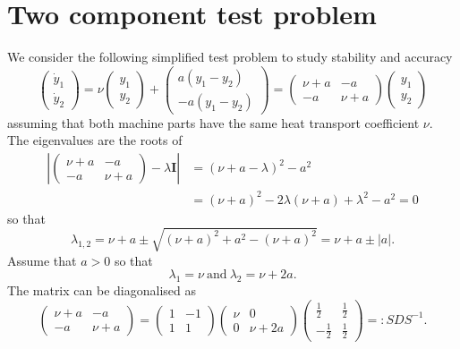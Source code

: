 \documentclass{article}
\newcommand{\ve}[1]{\mathbf{#1}}
\begin{document}
\section*{Two component test problem}
We consider the following simplified test problem to study stability and accuracy
\begin{equation}
	\begin{pmatrix} \dot{y}_1 \\ \dot{y}_2 \end{pmatrix} = \nu \begin{pmatrix} y_1 \\ y_2 \end{pmatrix} + \begin{pmatrix} a \left( y_1 - y_2 \right) \\ -a (y_1 - y_2) \end{pmatrix}
		= \begin{pmatrix}  \nu + a & -a \\ -a & \nu  +a \end{pmatrix} \begin{pmatrix} y_1 \\ y_2 \end{pmatrix}
\end{equation}
assuming that both machine parts have the same heat transport coefficient $\nu$.
The eigenvalues are the roots of
\begin{align*}
	\left| \begin{pmatrix}  \nu + a & -a \\ -a & \nu  +a \end{pmatrix} - \lambda \ve{I} \right| &= \left( \nu + a - \lambda \right)^2 - a^2 \\
	&= \left( \nu + a \right)^2 - 2 \lambda \left( \nu + a \right) + \lambda^2 - a^2 = 0
\end{align*}
so that
\begin{equation}
	\lambda_{1,2} = \nu + a \pm \sqrt{ \left(\nu+a\right)^2 + a^2 - \left( \nu + a \right)^2 } = \nu + a \pm \left| a \right|.
\end{equation}
Assume that $a > 0$ so that
\begin{equation}
	\lambda_1 = \nu \ \text{and} \ \lambda_2 = \nu + 2 a.
\end{equation}
The matrix can be diagonalised as
\begin{equation}
	\begin{pmatrix} \nu+a & -a \\ -a & \nu + a \end{pmatrix} = \begin{pmatrix} 1 & -1 \\ 1 & 1 \end{pmatrix} \begin{pmatrix} \nu & 0 \\ 0 & \nu + 2 a \end{pmatrix} \begin{pmatrix} \frac{1}{2} & \frac{1}{2} \\ -\frac{1}{2} & \frac{1}{2} \end{pmatrix} =: S D S^{-1}.
\end{equation}
\end{document}
